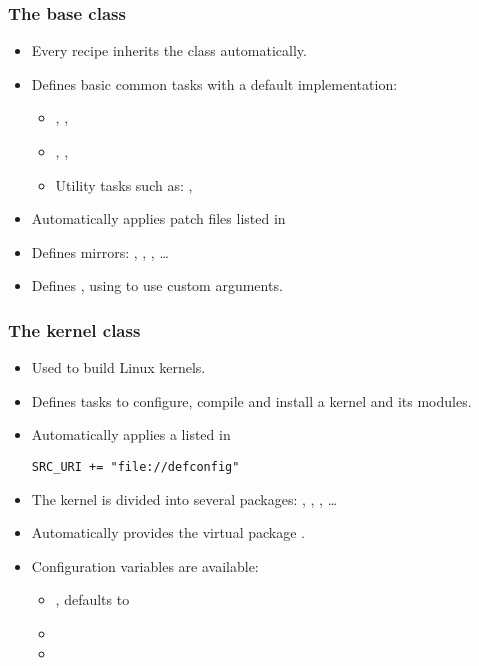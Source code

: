 \begin{frame}
  \frametitle{The base class}
  \begin{itemize}
    \item Every recipe inherits the  class automatically.
    \item Defines basic common tasks with a default implementation:
      \begin{itemize}
        \item {}, , 
        \item {}, , 
        \item Utility tasks such as: , 
      \end{itemize}
    \item Automatically applies patch files listed in 
    \item Defines mirrors: ,
      , , \dots
    \item Defines , using  to use
      custom arguments.
  \end{itemize}
\end{frame}

\begin{frame}[fragile]
  \frametitle{The kernel class}
  \begin{itemize}
    \item Used to build Linux kernels.
    \item Defines tasks to configure, compile and install a kernel and
          its modules.
    \item Automatically applies a  listed in 
      \begin{block}{}
        \begin{verbatim}
SRC_URI += "file://defconfig"
        \end{verbatim}
      \end{block}
    \item The kernel is divided into several packages: ,
          , ,
          \dots
    \item Automatically provides the virtual package
          .
    \item Configuration variables are available:
    \begin{itemize}
      \item {}, defaults to 
      \item {}
      \item {}
    \end{itemize}
  \end{itemize}
\end{frame}

